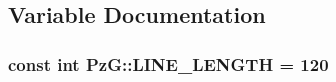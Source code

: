 \subsection{Variable Documentation}
\subsubsection[{\texorpdfstring{L\+I\+N\+E\+\_\+\+L\+E\+N\+G\+TH}{LINE_LENGTH}}]{\setlength{\rightskip}{0pt plus 5cm}const int Pz\+G\+::\+L\+I\+N\+E\+\_\+\+L\+E\+N\+G\+TH = 120}\hypertarget{namespace_pz_g_a6d8d7783183a08d769e3c695cd35587f}{}\label{namespace_pz_g_a6d8d7783183a08d769e3c695cd35587f}
